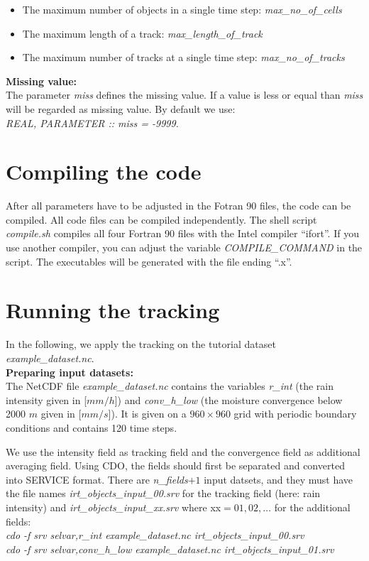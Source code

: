 \documentclass[11pt]{article}
\begin{document}
\begin{itemize}
\item The maximum number of objects in a single time step: {\it max\_no\_of\_cells}
\item The maximum length of a track: {\it max\_length\_of\_track}
\item The maximum number of tracks at a single time step: {\it max\_no\_of\_tracks}
\end{itemize}\vspace{0.5cm}
{\bf Missing value:}\\
The parameter {\it miss} defines the missing value. If a value is less or equal than {\it miss} will be regarded as missing value. By default we use:\\
{\it REAL, PARAMETER       :: miss = -9999.}

\section{Compiling the code}\label{sec_compile}

After all parameters have to be adjusted in the Fotran 90 files, the code can be compiled. All code files can be compiled independently. The shell script {\it compile.sh} compiles all four Fortran 90 files with the Intel compiler ``ifort''. If you use another compiler, you can adjust the variable {\it COMPILE\_COMMAND} in the script. The executables will be generated with the file ending ``.x''.

\section{Running the tracking}

In the following, we apply the tracking on the tutorial dataset {\it example\_dataset.nc}.\vspace{0.5cm} \\
{\bf Preparing input datasets:}\\
The NetCDF file {\it example\_dataset.nc} contains the variables {\it r\_int} (the rain intensity given in [$mm/h$]) and {\it conv\_h\_low} (the moisture convergence below 2000 $m$ given in [$mm/s$]). It is given on a $960\times 960$ grid with periodic boundary conditions and contains 120 time steps.

We use the intensity field as tracking field and the convergence field as additional averaging field. Using CDO, the fields should first be separated and converted into SERVICE format. There are {\it n\_fields}$+1$ input datsets, and they must have the file names {\it irt\_objects\_input\_00.srv} for the tracking field (here: rain intensity) and {\it irt\_objects\_input\_xx.srv} where xx$=01,02,\ldots$ for the additional fields:\\
{\it cdo -f srv selvar,r\_int example\_dataset.nc irt\_objects\_input\_00.srv}\\
{\it cdo -f srv selvar,conv\_h\_low example\_dataset.nc irt\_objects\_input\_01.srv}\\
\end{document}
